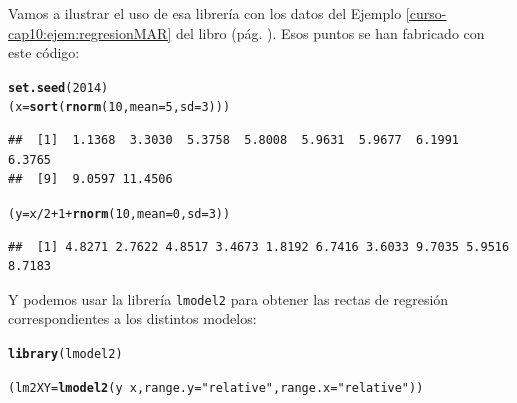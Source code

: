 \documentclass[10pt,a4paper]{article}\usepackage[]{graphicx}\usepackage[]{color}
\makeatletter
\newcommand{\hlnum}[1]{\textcolor[rgb]{0.686,0.059,0.569}{#1}}%
\newcommand{\hlstr}[1]{\textcolor[rgb]{0.192,0.494,0.8}{#1}}%
\newcommand{\hlopt}[1]{\textcolor[rgb]{0,0,0}{#1}}%
\newcommand{\hlstd}[1]{\textcolor[rgb]{0.345,0.345,0.345}{#1}}%
\newcommand{\hlkwb}[1]{\textcolor[rgb]{0.69,0.353,0.396}{#1}}%
\newcommand{\hlkwc}[1]{\textcolor[rgb]{0.333,0.667,0.333}{#1}}%
\newcommand{\hlkwd}[1]{\textcolor[rgb]{0.737,0.353,0.396}{\textbf{#1}}}%
\newenvironment{kframe}{%
 \def\at@end@of@kframe{}%
 \ifinner\ifhmode%
  \def\at@end@of@kframe{\end{minipage}}%
  \begin{minipage}{\columnwidth}%
 \fi\fi%
 \def\FrameCommand##1{\hskip\@totalleftmargin \hskip-\fboxsep
 \colorbox{shadecolor}{##1}\hskip-\fboxsep
     \hskip-\linewidth \hskip-\@totalleftmargin \hskip\columnwidth}%
 \MakeFramed {\advance\hsize-\width
   \@totalleftmargin\z@ \linewidth\hsize
   \@setminipage}}%
 {\par\unskip\endMakeFramed%
 \at@end@of@kframe}
\newenvironment{knitrout}{}{} %
\newcounter {cont01}
\makeatother
\begin{document}
Vamos a ilustrar el uso de esa librería con los datos del Ejemplo \ref{curso-cap10:ejem:regresionMAR} del libro (pág. \pageref{curso-cap10:ejem:regresionMAR}). Esos puntos se han fabricado con este código:
\begin{knitrout}
\color{fgcolor}\begin{kframe}
\begin{alltt}
\hlkwd{set.seed}\hlstd{(}\hlnum{2014}\hlstd{)}
\hlstd{(x} \hlkwb{=} \hlkwd{sort}\hlstd{(}\hlkwd{rnorm}\hlstd{(}\hlnum{10}\hlstd{,} \hlkwc{mean}\hlstd{=}\hlnum{5}\hlstd{,} \hlkwc{sd}\hlstd{=}\hlnum{3}\hlstd{)))}
\end{alltt}
\begin{verbatim}
##  [1]  1.1368  3.3030  5.3758  5.8008  5.9631  5.9677  6.1991  6.3765
##  [9]  9.0597 11.4506
\end{verbatim}
\begin{alltt}
\hlstd{(y} \hlkwb{=} \hlstd{x}\hlopt{/}\hlnum{2} \hlopt{+} \hlnum{1} \hlopt{+} \hlkwd{rnorm}\hlstd{(}\hlnum{10}\hlstd{,} \hlkwc{mean}\hlstd{=}\hlnum{0}\hlstd{,} \hlkwc{sd}\hlstd{=}\hlnum{3}\hlstd{))}
\end{alltt}
\begin{verbatim}
##  [1] 4.8271 2.7622 4.8517 3.4673 1.8192 6.7416 3.6033 9.7035 5.9516 8.7183
\end{verbatim}
\end{kframe}
\end{knitrout}
Y podemos usar la librería {\tt lmodel2} para obtener las rectas de regresión correspondientes a los distintos modelos:
\begin{knitrout}
\color{fgcolor}\begin{kframe}
\begin{alltt}
\hlkwd{library}\hlstd{(lmodel2)}
\end{alltt}


{\ttfamily\noindent\bfseries\color{errorcolor}{\#\# Error in library(lmodel2): there is no package called 'lmodel2'}}\begin{alltt}
\hlstd{(lm2XY} \hlkwb{=} \hlkwd{lmodel2}\hlstd{(y}\hlopt{~}\hlstd{x,}\hlkwc{range.y}\hlstd{=}\hlstr{"relative"}\hlstd{,} \hlkwc{range.x}\hlstd{=}\hlstr{"relative"} \hlstd{))}
\end{alltt}


{\ttfamily\noindent\bfseries{}}\end{kframe}
\end{knitrout}
\end{document}
